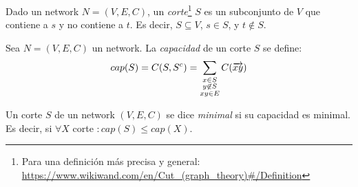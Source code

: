 \begin{definition}
  Dado un network $N = (V, E, C)$, un \emph{corte}\footnote{Para una definición más precisa y general: \url{https://www.wikiwand.com/en/Cut_(graph_theory)\#/Definition}} $S$ es un subconjunto de $V$
  que contiene a $s$ y no contiene a $t$. Es decir, $S \subseteq V$,
  $s \in S$, y $t \not\in S$.
\end{definition}

\begin{definition}
  Sea $N = (V, E, C)$ un network. La \emph{capacidad} de un corte $S$ se define:
  \begin{align}
    cap(S) = C(S, S^c) = \sum_{\substack{x\in S \\ y \not\in S \\ xy \in E}} C(\overrightarrow{xy})
  \end{align}
\end{definition}

\begin{definition}
  Un corte $S$ de un network $(V, E, C)$ se dice \emph{minimal} si su
  capacidad es minimal. Es decir, si
  $\forall X$ corte $ \colon cap(S) \le cap(X)$.
\end{definition}
